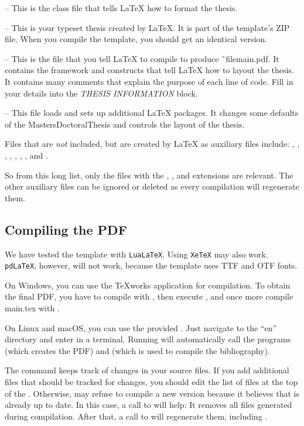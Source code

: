  -- This is the class file that tells LaTeX how to format the thesis.

 -- This is your typeset thesis created by LaTeX. It is part of the template's ZIP file. When you compile the template, you should get an identical version.

 -- This is the file that you tell LaTeX to compile to produce ˜file{main.pdf}. It contains the framework and constructs that tell LaTeX how to layout the thesis. It contains many comments that explain the purpose of each line of code. Fill in your details into the \emph{THESIS INFORMATION} block.

 -- This file loads and sets up additional LaTeX packages. It changes some defaults of the MastersDoctoralThesis and controls the layout of the thesis.

Files that are \emph{not} included, but are created by LaTeX as auxiliary files include: , , , , 
, , , and .

So from this long list, only the files with the , , and  extensions are relevant. The other auxiliary files can be ignored or deleted as every compilation will regenerate them.


\subsection{Compiling the PDF}

We have tested the template with \texttt{LuaLaTeX}. Using \texttt{XeTeX} may also work. \texttt{pdLaTeX}, however, will not work, because the template uses TTF and OTF fonts.

On Windows, you can use the TeXworks application for compilation. To obtain the final PDF, you have to compile  with , then execute , and once more compile main.tex with .

On Linux and macOS, you can use the provided . Just navigate to the ``en'' directory and enter  in a terminal. Running  will automatically call the programs  (which creates the PDF) and  (which is used to compile the bibliography).

The  command keeps track of changes in your source files. If you add additional files that should be tracked for changes, you should edit the list of files at the top of the . Otherwise,  may refuse to compile a new version because it believes that  is already up to date. In this case, a call to  will help: It removes all files generated during compilation. After that, a call to  will regenerate them, including .

